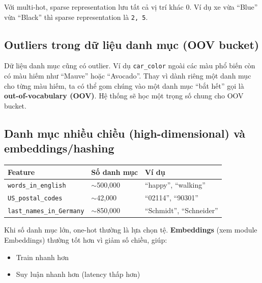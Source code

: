 \documentclass[12pt,a4paper]{article}
\begin{document}
\begin{luuy}
Với multi-hot, sparse representation lưu tất cả vị trí khác 0. Ví dụ xe vừa ``Blue'' vừa ``Black'' thì sparse representation là \texttt{2, 5}.
\end{luuy}

\subsection{Outliers trong dữ liệu danh mục (OOV bucket)}

\begin{ynghia}
Dữ liệu danh mục cũng có outlier. Ví dụ \texttt{car\_color} ngoài các màu phổ biến còn có màu hiếm như ``Mauve'' hoặc ``Avocado''. Thay vì dành riêng một danh mục cho từng màu hiếm, ta có thể gom chúng vào một danh mục ``bắt hết'' gọi là \textbf{out-of-vocabulary (OOV)}. Hệ thống sẽ học một trọng số chung cho OOV bucket.
\end{ynghia}

\subsection{Danh mục nhiều chiều (high-dimensional) và embeddings/hashing}

\begin{vidu}[title={Một số feature danh mục rất nhiều giá trị}]
\begin{center}
\small
\begin{tabular}{@{}lll@{}}
\toprule
\textbf{Feature} & \textbf{Số danh mục} & \textbf{Ví dụ} \\
\midrule
\texttt{words\_in\_english} & \(\sim\)500{,}000 & ``happy'', ``walking'' \\
\texttt{US\_postal\_codes} & \(\sim\)42{,}000 & ``02114'', ``90301'' \\
\texttt{last\_names\_in\_Germany} & \(\sim\)850{,}000 & ``Schmidt'', ``Schneider'' \\
\bottomrule
\end{tabular}
\end{center}
\end{vidu}

\begin{luuy}
Khi số danh mục lớn, one-hot thường là lựa chọn tệ. \textbf{Embeddings} (xem module Embeddings) thường tốt hơn vì giảm số chiều, giúp:
\begin{itemize}
  \item Train nhanh hơn
  \item Suy luận nhanh hơn (latency thấp hơn)
\end{itemize}
\end{luuy}
\end{document}
